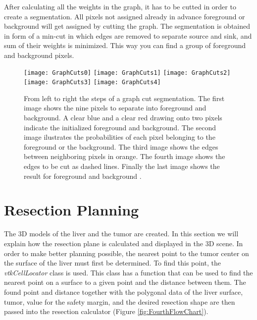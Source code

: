 After calculating all the weights in the graph, it has to be cutted in order to
create a segmentation. All pixels not assigned already in advance foreground or background will get assigned by
cutting the graph. The segmentation is obtained in form of a min-cut
\cite{Bagci2016} in which edges are removed to separate source and sink, and sum of their weights is
minimized.
This way you can find a group of foreground and background pixels.
\begin{figure}[H]
  \centering
  \texttt{[image: GraphCuts0]} 
  \endminipage
  \hfill
  \texttt{[image: GraphCuts1]} 
  \endminipage
  \hfill 
  \texttt{[image: GraphCuts2]} 
  \endminipage
  \hfill
  \texttt{[image: GraphCuts3]} 
  \endminipage
  \hfill
  \texttt{[image: GraphCuts4]} 
  \endminipage
  \hfill
 \caption{From left to right the steps of a graph cut segmentation. The first
   image shows the nine pixels to separate into foreground and background. A
   clear blue and a clear red drawing onto two pixels indicate the initialized
   foreground and background. The
   second image ilustrates the probabilities of each pixel belonging to the
   foreground or the background. The third image shows the edges between
   neighboring pixels in orange. The fourth image shows the edges to be cut as
   dashed lines. Finally the last image shows the result for foreground and
   background \cite{Bagci2016}.}
  \label{fig:graphCutsExplanaition}
\end{figure}

\section{Resection Planning}
The 3D models of the liver and the tumor are created. In this section we will
explain how the resection plane is calculated and displayed in the 3D scene. In
order to make better planning possible, the nearest point to the tumor center on
the surface of the liver must first be determined. To find this point, the
\textit{vtkCellLocator} class is used. This class has a function that can be
used to find the nearest point on a surface to a given point and the distance
between them. The found point and distance together with the polygonal data of
the liver surface, tumor, value for the safety margin, and the desired resection
shape are then passed into the resection calculator (Figure
\ref{fig:FourthFlowChart}).

